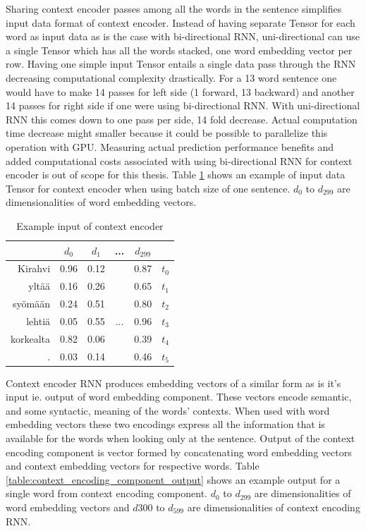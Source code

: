\documentclass[12pt,a4paper,english
]{tutthesis}
\begin{document}
Sharing context encoder passes among all the words in the sentence simplifies input data format of context encoder. Instead of having separate Tensor for each word as input data as is the case with bi-directional RNN, uni-directional can use a single Tensor which has all the words stacked, one word embedding vector per row. Having one simple input Tensor entails a single data pass through the RNN decreasing computational complexity drastically. For a 13 word sentence one would have to make 14 passes for left side (1 forward, 13 backward) and another 14 passes for right side if one were using bi-directional RNN. With uni-directional RNN this comes down to one pass per side, 14 fold decrease. Actual computation time decrease might smaller because it could be possible to parallelize this operation with GPU. Measuring actual prediction performance benefits and added computational costs associated with using bi-directional RNN for context encoder is out of scope for this thesis. Table \ref{table:context_encoder_input} shows an example of input data Tensor for context encoder when using batch size of one sentence. $d_0$ to $d_{299}$ are dimensionalities of word embedding vectors.

\begin{table}[htbp]
\caption{Example input of context encoder}
\label{table:context_encoder_input}
\centering
\begin{tabular}{|r|c|c|c|c|l|}
  \hline
  & $d_0$ & $d_1$ & ... & $d_{299}$ & \\
  \hline
  \hline
  Kirahvi & 0.96 & 0.12 & & 0.87 & $t_0$ \\
  yltää & 0.16 & 0.26 & & 0.65 & $t_1$ \\
  syömään & 0.24 & 0.51 & & 0.80 & $t_2$ \\
  lehtiä & 0.05 & 0.55 & ... & 0.96 & $t_3$ \\
  korkealta & 0.82 & 0.06 & & 0.39 & $t_4$ \\
  . & 0.03 & 0.14 & & 0.46 & $t_5$ \\
  \hline
\end{tabular}
\end{table}

Context encoder RNN produces embedding vectors of a similar form as is it's input ie. output of word embedding component. These vectors encode semantic, and some syntactic, meaning of the words' contexts. When used with word embedding vectors these two encodings express all the information that is available for the words when looking only at the sentence. Output of the context encoding component is vector formed by concatenating word embedding vectors and context embedding vectors for respective words. Table \ref{table:context_encoding_component_output} shows an example output for a single word from context encoding component. $d_0$ to $d_{299}$ are dimensionalities of word embedding vectors and $d{300}$ to $d_{599}$ are dimensionalities of context encoding RNN.
\end{document}
